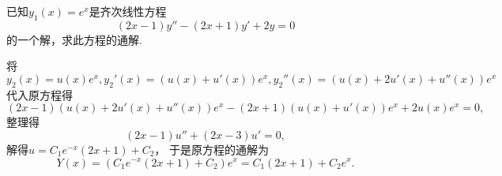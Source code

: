 \begin{example}
已知\(y_1(x) = e^x\)是齐次线性方程\begin{equation*}
	(2x-1)y'' - (2x+1)y' + 2y = 0
\end{equation*}的一个解，求此方程的通解.
\begin{solution}
将\(y_2(x) = u(x) e^x,
y_2'(x) = (u(x) + u'(x)) e^x,
y_2''(x) = (u(x) + 2 u'(x) + u''(x)) e^x\)代入原方程得\begin{equation*}
	(2x-1) (u(x) + 2 u'(x) + u''(x)) e^x
	- (2x+1) (u(x) + u'(x)) e^x
	+ 2 u(x) e^x
	= 0,
\end{equation*}
整理得\begin{equation*}
	(2x-1)u'' + (2x-3)u' = 0,
\end{equation*}
解得\(u = C_1 e^{-x} (2x+1) + C_2\)，
于是原方程的通解为\begin{equation*}
	Y(x) = (C_1 e^{-x} (2x+1) + C_2) e^x
	= C_1 (2x+1) + C_2 e^x.
\end{equation*}
\end{solution}
\end{example}
